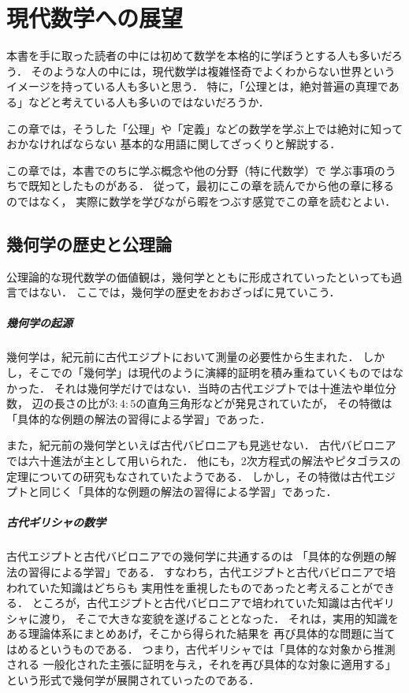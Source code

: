 \chapter{現代数学への展望}
\label{chp:gensuu}
 本書を手に取った読者の中には初めて数学を本格的に学ぼうとする人も多いだろう．
 そのような人の中には，現代数学は複雑怪奇でよくわからない世界という
 イメージを持っている人も多いと思う．
 特に，「公理とは，絶対普遍の真理である」などと考えている人も多いのではないだろうか．

 この章では，そうした「公理」や「定義」などの数学を学ぶ上では絶対に知っておかなければならない
 基本的な用語に関してざっくりと解説する．

 この章では，本書でのちに学ぶ概念や他の分野（特に代数学）で
 学ぶ事項のうちで既知としたものがある．
 従って，最初にこの章を読んでから他の章に移るのではなく，
 実際に数学を学びながら暇をつぶす感覚でこの章を読むとよい．

 \newpage

 \section{幾何学の歴史と公理論}
 \label{sec:kikakouri}
  公理論的な現代数学の価値観は，幾何学とともに形成されていったといっても過言ではない．
  ここでは，幾何学の歴史をおおざっぱに見ていこう．

 \paragraph{幾何学の起源}
  幾何学は，紀元前に古代エジプトにおいて測量の必要性から生まれた．
  しかし，そこでの「幾何学」は現代のように演繹的証明を積み重ねていくものではなかった．
  それは幾何学だけではない．当時の古代エジプトでは十進法や単位分数，
  辺の長さの比が$3:4:5$の直角三角形などが発見されていたが，
  その特徴は「具体的な例題の解法の習得による学習」であった．

  また，紀元前の幾何学といえば古代バビロニアも見逃せない．
  古代バビロニアでは六十進法が主として用いられた．
  他にも，2次方程式の解法やピタゴラスの定理についての研究もなされていたようである．
  しかし，その特徴は古代エジプトと同じく「具体的な例題の解法の習得による学習」であった．

 \paragraph{古代ギリシャの数学}
  古代エジプトと古代バビロニアでの幾何学に共通するのは
  「具体的な例題の解法の習得による学習」である．
  すなわち，古代エジプトと古代バビロニアで培われていた知識はどちらも
  実用性を重視したものであったと考えることができる．
  ところが，古代エジプトと古代バビロニアで培われていた知識は古代ギリシャに渡り，
  そこで大きな変貌を遂げることとなった．
  それは，実用的知識をある理論体系にまとめあげ，そこから得られた結果を
  再び具体的な問題に当てはめるというものである．
  つまり，古代ギリシャでは「具体的な対象から推測される
  一般化された主張に証明を与え，それを再び具体的な対象に適用する」
  という形式で幾何学が展開されていったのである．

